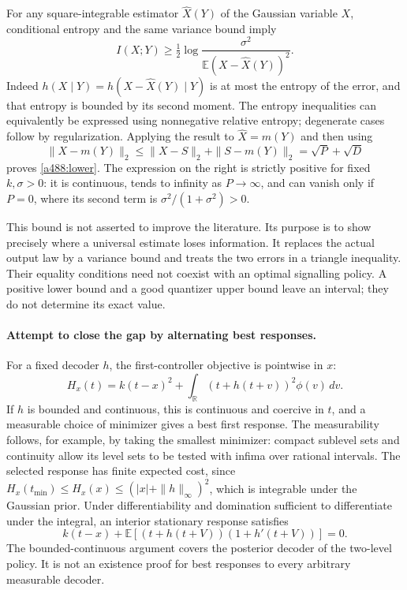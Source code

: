 \documentclass[11pt]{article}
\begin{document}
For any square-integrable estimator $\widehat X(Y)$ of the Gaussian
variable $X$, conditional entropy and the same variance bound imply
\[
 I(X;Y)\ge\tfrac12\log
            \frac{\sigma^2}{\mathbb E(X-\widehat X(Y))^2}.
\]
Indeed $h(X\mid Y)=h(X-\widehat X(Y)\mid Y)$ is at most the entropy
of the error, and that entropy is bounded by its second moment.
The entropy inequalities can equivalently be expressed using nonnegative
relative entropy; degenerate cases follow by regularization.
Applying the result to $\widehat X=m(Y)$ and then using
\[
 \|X-m(Y)\|_2\le\|X-S\|_2+\|S-m(Y)\|_2=\sqrt P+\sqrt D
\]
proves \eqref{a488:lower}. The expression on the right is strictly
positive for fixed $k,\sigma>0$: it is continuous, tends to infinity
as $P\to\infty$, and can vanish only if $P=0$, where its second term
is $\sigma^2/(1+\sigma^2)>0$.

This bound is not asserted to improve the literature. Its purpose is to
show precisely where a universal estimate loses information. It replaces
the actual output law by a variance bound and treats the two errors in
a triangle inequality. Their equality conditions need not coexist with
an optimal signalling policy. A positive lower bound and a good quantizer
upper bound leave an interval; they do not determine its exact value.

\paragraph{Attempt to close the gap by alternating best responses.}
For a fixed decoder $h$, the first-controller objective is pointwise in
$x$:
\[
       H_x(t)=k(t-x)^2+\int_{\mathbb R}(t+h(t+v))^2\phi(v)\,dv.
\]
If $h$ is bounded and continuous, this is continuous and coercive in $t$,
and a measurable choice of minimizer gives a best first response. The
measurability follows, for example, by taking the smallest minimizer:
compact sublevel sets and continuity allow its level sets to be tested
with infima over rational intervals. The selected response has finite
expected cost, since $H_x(t_{\min})\leq H_x(x)\leq
(|x|+\|h\|_\infty)^2$, which is integrable under the Gaussian prior.
Under differentiability and
domination sufficient to differentiate under the integral, an interior
stationary response satisfies
\begin{equation}\label{a488:firstresponse}
 k(t-x)+\mathbb E[(t+h(t+V))(1+h'(t+V))]=0.
\end{equation}
The bounded-continuous argument covers the posterior decoder of the
two-level policy. It is not an existence proof for best responses to
every arbitrary measurable decoder.
\end{document}
